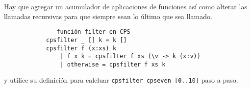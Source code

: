 \documentclass{article}
\newcommand{\tx}[1]{\texttt{#1}}
\begin{document}
\begin{enumerate}
        Hay que agregar un acumulador de aplicaciones de funciones así como 
        alterar las llamadas recursivas para que siempre sean lo último que sea 
        llamado.

        \begin{verbatim}
            -- función filter en CPS
            cpsfilter _ [] k = k []
            cpsfilter f (x:xs) k 
                | f x k = cpsfilter f xs (\v -> k (x:v))
                | otherwise = cpsfilter f xs k
        \end{verbatim}

        y utilice su definición para calcluar \tx{cpsfilter cpseven [0..10]} 
        paso a paso.
        
    \end{enumerate}
\end{document}
